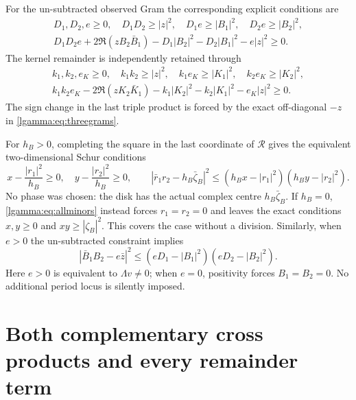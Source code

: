 \documentclass[11pt]{article}
\begin{document}
For the un-subtracted observed Gram the corresponding explicit conditions
are
\begin{equation}\label{lgamma:eq:observedminors}
 \begin{gathered}
 D_1,D_2,e\ge0,\quad D_1D_2\ge|z|^2,\quad
 D_1e\ge|B_1|^2,\quad D_2e\ge|B_2|^2,\\
 D_1D_2e+2\Re(zB_2\bar B_1)
 -D_1|B_2|^2-D_2|B_1|^2-e|z|^2\ge0.
 \end{gathered}
\end{equation}
The kernel remainder is independently retained through
\begin{equation}\label{lgamma:eq:kernelminors}
 \begin{gathered}
 k_1,k_2,e_K\ge0,\quad k_1k_2\ge|z|^2,\quad
 k_1e_K\ge|K_1|^2,\quad k_2e_K\ge|K_2|^2,\\
 k_1k_2e_K-2\Re(zK_2\bar K_1)
 -k_1|K_2|^2-k_2|K_1|^2-e_K|z|^2\ge0.
 \end{gathered}
\end{equation}
The sign change in the last triple product is forced by the exact
off-diagonal $-z$ in \eqref{lgamma:eq:threegrams}.

For $h_B>0$, completing the square in the last coordinate of
$\mathcal R$ gives the equivalent two-dimensional Schur conditions
\begin{equation}\label{lgamma:eq:resdisk}
 x-\frac{|r_1|^2}{h_B}\ge0,\quad
 y-\frac{|r_2|^2}{h_B}\ge0,\qquad
 \left|\bar r_1r_2-h_B\bar\zeta_B\right|^2
 \le(h_Bx-|r_1|^2)(h_By-|r_2|^2).
\end{equation}
No phase was chosen: the disk has the actual complex centre
$h_B\bar\zeta_B$.  If $h_B=0$, \eqref{lgamma:eq:allminors} instead forces
$r_1=r_2=0$ and leaves the exact conditions $x,y\ge0$ and
$xy\ge|\zeta_B|^2$.  This covers the case without a division.
Similarly, when $e>0$ the un-subtracted constraint implies
\begin{equation}\label{lgamma:eq:Bdisk}
 |\bar B_1B_2-e\bar z|^2
 \le(eD_1-|B_1|^2)(eD_2-|B_2|^2).
\end{equation}
Here $e>0$ is equivalent to $\Lambda v\ne0$; when $e=0$, positivity
forces $B_1=B_2=0$.  No additional period locus is silently imposed.

\section{Both complementary cross products and every remainder term}
\end{document}
